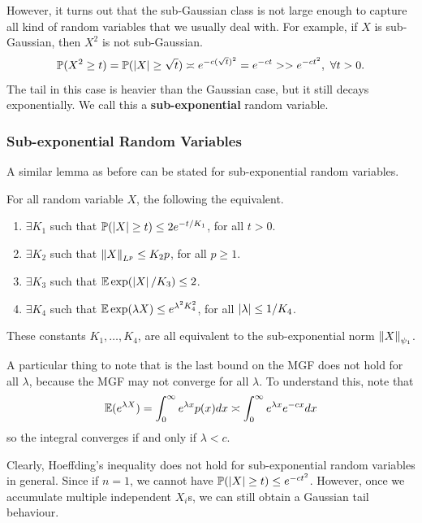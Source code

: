 \documentclass[12pt]{article}
\begin{document}
However, it turns out that the sub-Gaussian class is not large enough to capture all kind of random variables that we usually deal with. For example, if $X$ is sub-Gaussian, then $X^2$ is not sub-Gaussian.
\begin{equation*}
    \mathbb{P}(X^2 \geq t) = \mathbb{P}(\left\lvert X \right\rvert \geq \sqrt{t}) \asymp e^{-c(\sqrt{t})^2} = e^{-ct} >> e^{-ct^2}, \ \forall t > 0.
\end{equation*}
\noindent The tail in this case is heavier than the Gaussian case, but it still decays exponentially. We call this a \textbf{sub-exponential} random variable.

\subsubsection{Sub-exponential Random Variables}

A similar lemma as before can be stated for sub-exponential random variables.

\begin{lemma}
    For all random variable $X$, the following the equivalent.
    \begin{enumerate}
        \item $\exists K_1$ such that $\mathbb{P}(\left\lvert X \right\rvert \geq t) \leq 2 e^{-t/K_1}$, for all $t > 0$.
        \item $\exists K_2$ such that $\left\Vert X \right\Vert_{L^p} \leq K_2 p$, for all $p \geq 1$.
        \item $\exists K_3$ such that $\mathbb{E}\exp(\left\lvert X \right\rvert/K_3) \leq 2$.
        \item $\exists K_4$ such that $\mathbb{E}\exp(\lambda X) \leq e^{\lambda^2 K_4^2}$, for all $\left\lvert \lambda \right\rvert \leq 1/K_4$.
    \end{enumerate}
    \noindent These constants $K_1, \dots, K_4$, are all equivalent to the sub-exponential norm $\left\Vert X \right\Vert_{\psi_1}$.
\end{lemma}

A particular thing to note that is the last bound on the MGF does not hold for all $\lambda$, because the MGF may not converge for all $\lambda$. To understand this, note that
\begin{equation*}
    \mathbb{E}(e^{\lambda X})= \int_0^\infty e^{\lambda x} p(x)dx \asymp \int_0^\infty e^{\lambda x}e^{-cx} dx
\end{equation*}
\noindent so the integral converges if and only if $\lambda < c$.

Clearly, Hoeffding's inequality does not hold for sub-exponential random variables in general. Since if $n = 1$, we cannot have $\mathbb{P}(\left\lvert X \right\rvert \geq t) \leq e^{-ct^2}$. However, once we accumulate multiple independent $X_i$s, we can still obtain a Gaussian tail behaviour.
\end{document}
